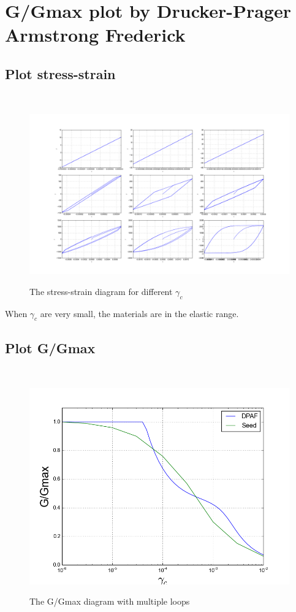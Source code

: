 \documentclass[fleqn,11pt]{article}
\begin{document}
\section{G/Gmax plot by Drucker-Prager Armstrong Frederick}

\subsection{Plot stress-strain} ~



\begin{figure}[H]
  \caption{The stress-strain diagram for different $\gamma_c$}
  \centering
    \includegraphics[width=17cm]{../Figure-files/G_stress_strain_plot.png}
    \label{fig:stress_strain}
\end{figure}


When $\gamma_c$ are very small, the materials are in the elastic range. 

\newpage
\subsection{Plot G/Gmax} ~

\begin{figure}[H]
  \caption{The G/Gmax diagram with multiple loops}
  \centering
    \includegraphics[width=17cm]{../Figure-files/G_Gmax_plot.png}
    \label{fig:G_Gmax}
\end{figure}
\end{document}
